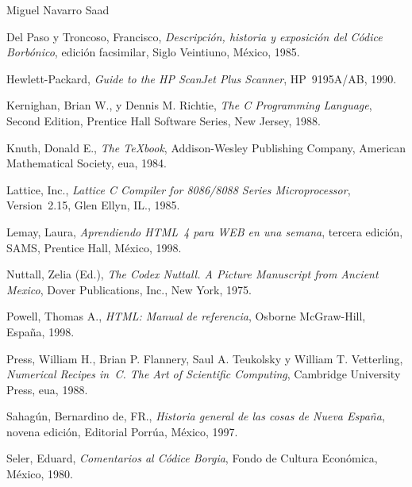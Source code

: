 \noindent\hfill {\vv Miguel Navarro Saad}

\def\.{\noindent{}\ignorespaces}

\vskip2pc
\.Del Paso y Troncoso, Francisco, {\it Descripci\'on, historia y exposici\'on
del C\'odice Borb\'onico}, edici\'on facsimilar, Siglo Veintiuno, M\'exico,
1985.

\.Hewlett-Packard, {\it Guide to the HP ScanJet Plus Scanner}, HP~9195A/AB,
1990.

\.Kernighan, Brian W., y Dennis M. Richtie, {\it The C Programming Language},
Second Edition, Prentice Hall Software Series, New Jersey, 1988.

\.Knuth, Donald E., {\it The \TeX book}, Addison-Wesley Publishing Company,
American Mathematical Society, {\vv eua}, 1984.

\.Lattice, Inc., {\it Lattice C Compiler for 8086/8088 Series Microprocessor},
Version~2.15, Glen Ellyn, IL., 1985.

\.Lemay, Laura, {\it Aprendiendo HTML~4 para WEB en una semana}, tercera
edici\'on, SAMS, Prentice Hall, M\'exico, 1998.

\.Nuttall, Zelia (Ed.), {\it The Codex Nuttall. A Picture Manuscript from
Ancient Mexico}, Dover Publications, Inc., New York, 1975.

\.Powell, Thomas A., {\it HTML: Manual de referencia}, Osborne McGraw-Hill,
Espa\~na, 1998.

\.Press, William H., Brian P. Flannery, Saul A. Teukolsky y William T.
Vetterling, {\it Numerical Recipes in~C. The Art of Scientific Computing},
Cambridge University Press, {\vv eua}, 1988.

\.Sahag\'un, Bernardino de, FR., {\it Historia general de las cosas de Nueva
Espa\~na}, novena edici\'on, Editorial Porr\'ua, M\'exico, 1997.

\.Seler, Eduard, {\it Comentarios al C\'odice Borgia}, Fondo de Cultura
Econ\'omica, M\'exico, 1980.
